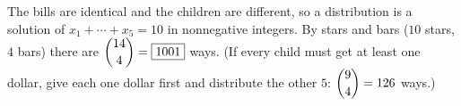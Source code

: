 The bills are identical and the children are different, so a distribution is a solution of $x_1+\cdots+x_5=10$ in nonnegative integers. By stars and bars ($10$ stars, $4$ bars) there are $\dbinom{14}{4}=\boxed{1001}$ ways. (If every child must get at least one dollar, give each one dollar first and distribute the other $5$: $\dbinom94=126$ ways.)
